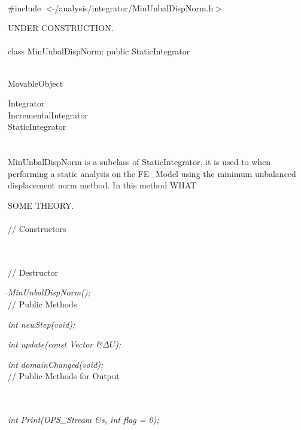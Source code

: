 
   \\
\#include $<\tilde{ }$/analysis/integrator/MinUnbalDispNorm.h$>$  


UNDER CONSTRUCTION.\\

  \\
class MinUnbalDispNorm: public StaticIntegrator  


 \\
MovableObject 

\indent\indent Integrator \\
\indent\indent\indent IncrementalIntegrator \\
\indent\indent\indent\indent StaticIntegrator \\
\indent\indent\indent\indent{} \\

 \\ 
\indent MinUnbalDispNorm is a subclass of StaticIntegrator, it is
used to when performing a static analysis on the FE\_Model using the
minimum unbalanced displacement norm method. In this method WHAT

SOME THEORY.\\

 \\
// Constructors 

\\ \\
// Destructor 

{\em $\tilde{ }$MinUnbalDispNorm();}\\  

// Public Methods 

{\em int newStep(void);} 

{\em int update(const Vector \&$\Delta U$);} 

{\em int domainChanged(void);} \\ 

// Public Methods for Output

\\ 
\\ 
{\em int Print(OPS_Stream \&s, int flag = 0);}


